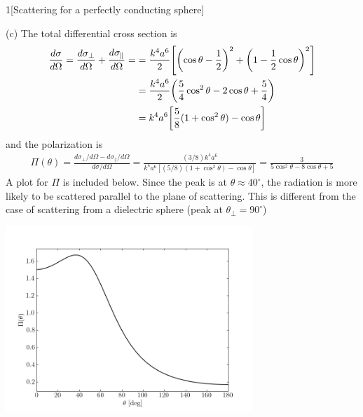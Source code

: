 \documentclass[12pt]{article}
\begin{document}
\begin{problem}{1}[Scattering for a perfectly conducting sphere]
\begin{solution}
(c) The total differential cross section is
\begin{align}
    \frac{d\sigma}{d\Omega}=\frac{d\sigma_\bot}{d\Omega}+\frac{d\sigma_\parallel}{d\Omega}=
    &=\frac{k^4a^6}{2}\qty[\qty(\cos\theta-\frac12)^2+\qty(1-\frac12\cos\theta)^2]\notag\\
    &=\frac{k^4a^6}{2}\qty(\frac54\cos^2\theta-2\cos\theta+\frac54)\notag\\
    &=k^4a^6\qty[\frac58(1+\cos^2\theta)-\cos\theta]
\end{align}
and the polarization is
\begin{align}
    \Pi(\theta)
    =\frac{d\sigma_\bot/d\Omega-d\sigma_\|/d\Omega}{d\sigma/d\Omega}
    =\frac{(3/8)k^4a^6}{k^4a^6[(5/8)(1+\cos^2\theta)-\cos\theta]}
    =\frac{3}{5\cos^2\theta-8\cos\theta+5}
\end{align}
A plot for $\Pi$ is included below. Since the peak is at
$\theta\approx40^\circ$, the radiation is more likely to be scattered parallel
to the plane of scattering. This is different from the case of scattering from a
dielectric sphere (peak at $\theta_\bot=90^\circ$)
\begin{center}
    \includegraphics[width=0.7\textwidth]{p1c.png}
\end{center}
\end{solution}
\end{problem}
\newpage
\end{document}
